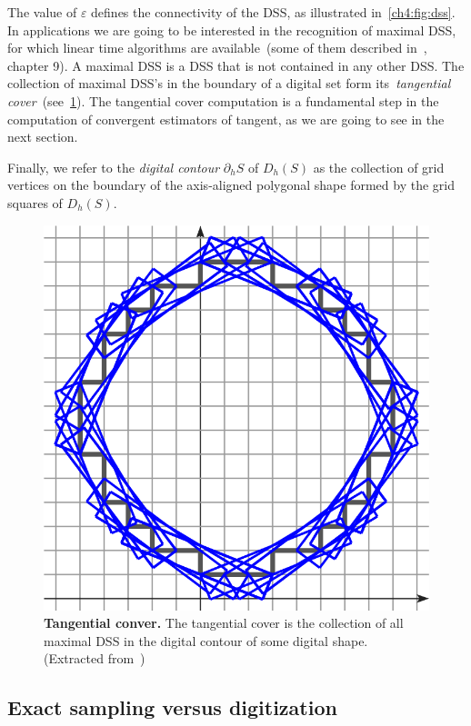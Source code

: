 The value of $\varepsilon$ defines the connectivity of the DSS, as illustrated in~\cref{ch4:fig:dss}. In applications we are going to be interested in the recognition of maximal DSS, for which linear time algorithms are available~(some of them described in~\cite{klette04digital}, chapter 9). A maximal DSS is a DSS that is not contained in any other DSS. The collection of maximal DSS's in the boundary of a digital set form its~\emph{tangential cover}~(see~\cref{ch4:fig:tangential-cover}). The tangential cover computation is a fundamental step in the computation of convergent estimators of tangent, as we are going to see in the next section.

Finally, we refer to the \emph{digital contour} $\partial_h S$ of $D_h(S)$ as the collection of grid vertices on the boundary of the axis-aligned polygonal shape formed by the grid squares of $D_h(S)$.

\begin{figure}
\center
\includegraphics[scale=1]{figures/chapter4/dss/tangential-cover.png}
\caption{\textbf{Tangential conver.} The tangential cover is the collection of all maximal DSS in the digital contour of some digital shape. (Extracted from~\cite{lachaud13multigrid})}
\label{ch4:fig:tangential-cover}
\end{figure}


\subsection{Exact sampling versus digitization}

